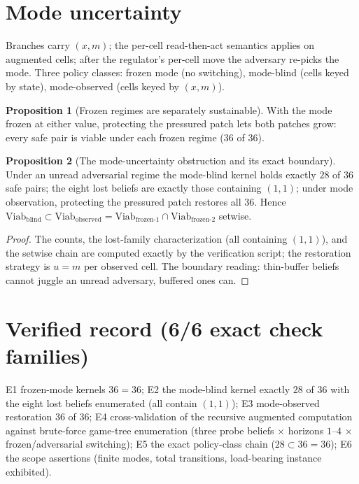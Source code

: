 \documentclass[10pt,twocolumn]{article}
\theoremstyle{definition}
\newtheorem{proposition}{Proposition}
\begin{document}
\section{Mode uncertainty}

Branches carry $(x,m)$; the per-cell read-then-act semantics applies on
augmented cells; after the regulator's per-cell move the adversary
re-picks the mode. Three policy classes: frozen mode (no switching),
mode-blind (cells keyed by state), mode-observed (cells keyed by
$(x,m)$).

\begin{proposition}[Frozen regimes are separately sustainable]
With the mode frozen at either value, protecting the pressured patch lets
both patches grow: every safe pair is viable under each frozen regime
($36$ of $36$).
\end{proposition}

\begin{proposition}[The mode-uncertainty obstruction and its exact boundary]
\label{prop:hybrid}
Under an unread adversarial regime the mode-blind kernel holds exactly
$28$ of $36$ safe pairs; the eight lost beliefs are exactly those
containing $(1,1)$; under mode observation, protecting the pressured
patch restores all $36$. Hence
$\mathrm{Viab}_{\text{blind}}\subset
\mathrm{Viab}_{\text{observed}}=\mathrm{Viab}_{\text{frozen-}1}\cap
\mathrm{Viab}_{\text{frozen-}2}$ setwise.
\end{proposition}
\begin{proof}
The counts, the lost-family characterization (all containing $(1,1)$),
and the setwise chain are computed exactly by the verification script; the
restoration strategy is $u=m$ per observed cell. The boundary reading:
thin-buffer beliefs cannot juggle an unread adversary, buffered ones can.
\end{proof}

\section{Verified record (6/6 exact check families)}

E1 frozen-mode kernels $36=36$; E2 the mode-blind kernel exactly $28$ of
$36$ with the eight lost beliefs enumerated (all contain $(1,1)$); E3
mode-observed restoration $36$ of $36$; E4 cross-validation of the
recursive augmented computation against brute-force game-tree enumeration
(three probe beliefs $\times$ horizons $1$--$4$ $\times$
frozen/adversarial switching); E5 the exact policy-class chain
($28\subset36=36$); E6 the scope assertions (finite modes, total
transitions, load-bearing instance exhibited).
\end{document}
